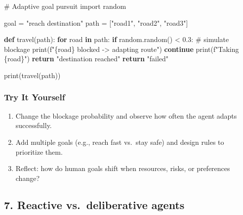 \documentclass[
  letterpaper,
  DIV=11,
  numbers=noendperiod]{scrreprt}
\newenvironment{Shaded}{\begin{snugshade}}{\end{snugshade}}
\newcommand{\BuiltInTok}[1]{\textcolor[rgb]{0.00,0.23,0.31}{#1}}
\newcommand{\CommentTok}[1]{\textcolor[rgb]{0.37,0.37,0.37}{#1}}
\newcommand{\ControlFlowTok}[1]{\textcolor[rgb]{0.00,0.23,0.31}{\textbf{#1}}}
\newcommand{\FloatTok}[1]{\textcolor[rgb]{0.68,0.00,0.00}{#1}}
\newcommand{\ImportTok}[1]{\textcolor[rgb]{0.00,0.46,0.62}{#1}}
\newcommand{\KeywordTok}[1]{\textcolor[rgb]{0.00,0.23,0.31}{\textbf{#1}}}
\newcommand{\NormalTok}[1]{\textcolor[rgb]{0.00,0.23,0.31}{#1}}
\newcommand{\OperatorTok}[1]{\textcolor[rgb]{0.37,0.37,0.37}{#1}}
\newcommand{\SpecialCharTok}[1]{\textcolor[rgb]{0.37,0.37,0.37}{#1}}
\newcommand{\SpecialStringTok}[1]{\textcolor[rgb]{0.13,0.47,0.30}{#1}}
\newcommand{\StringTok}[1]{\textcolor[rgb]{0.13,0.47,0.30}{#1}}
\providecommand{\tightlist}{%
  \setlength{\itemsep}{0pt}\setlength{\parskip}{0pt}}
\begin{document}
\begin{Shaded}
\begin{Highlighting}[]
\CommentTok{\# Adaptive goal pursuit}
\ImportTok{import}\NormalTok{ random}

\NormalTok{goal }\OperatorTok{=} \StringTok{"reach destination"}
\NormalTok{path }\OperatorTok{=}\NormalTok{ [}\StringTok{"road1"}\NormalTok{, }\StringTok{"road2"}\NormalTok{, }\StringTok{"road3"}\NormalTok{]}

\KeywordTok{def}\NormalTok{ travel(path):}
    \ControlFlowTok{for}\NormalTok{ road }\KeywordTok{in}\NormalTok{ path:}
        \ControlFlowTok{if}\NormalTok{ random.random() }\OperatorTok{\textless{}} \FloatTok{0.3}\NormalTok{:  }\CommentTok{\# simulate blockage}
            \BuiltInTok{print}\NormalTok{(}\SpecialStringTok{f"}\SpecialCharTok{\{}\NormalTok{road}\SpecialCharTok{\}}\SpecialStringTok{ blocked {-}\textgreater{} adapting route"}\NormalTok{)}
            \ControlFlowTok{continue}
        \BuiltInTok{print}\NormalTok{(}\SpecialStringTok{f"Taking }\SpecialCharTok{\{}\NormalTok{road}\SpecialCharTok{\}}\SpecialStringTok{"}\NormalTok{)}
        \ControlFlowTok{return} \StringTok{"destination reached"}
    \ControlFlowTok{return} \StringTok{"failed"}

\BuiltInTok{print}\NormalTok{(travel(path))}
\end{Highlighting}
\end{Shaded}

\subsubsection{Try It Yourself}\label{try-it-yourself-5}

\begin{enumerate}
\def\labelenumi{\arabic{enumi}.}
\tightlist
\item
  Change the blockage probability and observe how often the agent adapts
  successfully.
\item
  Add multiple goals (e.g., reach fast vs.~stay safe) and design rules
  to prioritize them.
\item
  Reflect: how do human goals shift when resources, risks, or
  preferences change?
\end{enumerate}

\subsection{7. Reactive vs.~deliberative
agents}\label{reactive-vs.-deliberative-agents}
\end{document}

